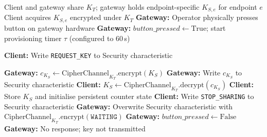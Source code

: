 \documentclass[journal]{IEEEtran}
\begin{document}
\begin{algorithm}[!t]
\caption{CipherChannel Key Exchange Protocol}
\label{alg:keyex}
\footnotesize
\begin{algorithmic}[1]
\Require Client and gateway share $K_T$; gateway holds endpoint-specific $K_{S,e}$ for endpoint $e$
\Ensure  Client acquires $K_{S,e}$ encrypted under $K_T$
\State \textbf{Gateway:} Operator physically presses button on gateway hardware
\State \textbf{Gateway:} $\mathit{button\_pressed} \leftarrow \text{True}$;
       start provisioning timer $\tau$ (configured to 60\,s)

\State \textbf{Client:} Write \texttt{REQUEST\_KEY} to Security characteristic

  \State \textbf{Gateway:} $c_{K_S} \leftarrow
         \text{CipherChannel}_{K_T}.\text{encrypt}(K_S)$
  \State \textbf{Gateway:} Write $c_{K_S}$ to Security characteristic
  \State \textbf{Client:} $K_S \leftarrow
         \text{CipherChannel}_{K_T}.\text{decrypt}(c_{K_S})$
  \State \textbf{Client:} Store $K_S$ and initialise persistent counter state
  \State \textbf{Client:} Write \texttt{STOP\_SHARING} to Security characteristic
  \State \textbf{Gateway:} Overwrite Security characteristic with
         $\text{CipherChannel}_{K_T}.\text{encrypt}(\texttt{WAITING})$
  \State \textbf{Gateway:} $\mathit{button\_pressed} \leftarrow \text{False}$
\Else
  \State \textbf{Gateway:} No response; key not transmitted
\EndIf
\end{algorithmic}
\end{algorithm}



\end{document}
